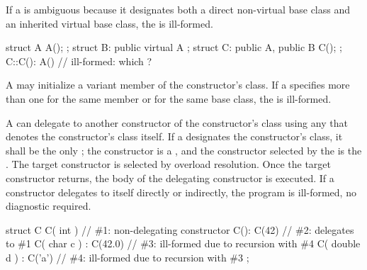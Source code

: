 \pnum
If a
is ambiguous because it designates both a direct non-virtual base class and
an inherited virtual base class, the
is ill-formed.
\begin{example}

\begin{codeblock}
struct A { A(); };
struct B: public virtual A { };
struct C: public A, public B { C(); };
C::C(): A() { }                 // ill-formed: which ?
\end{codeblock}
\end{example}

\pnum
A
may initialize a variant member of the
constructor's class.
If a
specifies more than one
for the same member or for the same base class,
the
is ill-formed.

\pnum
A  can delegate to another
constructor of the constructor's class using any
 that denotes the constructor's class itself. If a
 designates the constructor's class,
it shall be the only ; the constructor
is a , and the constructor selected by the
 is the .
The target constructor is selected by overload resolution.
Once the target constructor returns, the body of the delegating constructor
is executed. If a constructor delegates to itself directly or indirectly,
the program is ill-formed, no diagnostic required. \begin{example}

\begin{codeblock}
struct C {
  C( int ) { }                  // \#1: non-delegating constructor
  C(): C(42) { }                // \#2: delegates to \#1
  C( char c ) : C(42.0) { }     // \#3: ill-formed due to recursion with \#4
  C( double d ) : C('a') { }    // \#4: ill-formed due to recursion with \#3
};
\end{codeblock}
\end{example}

